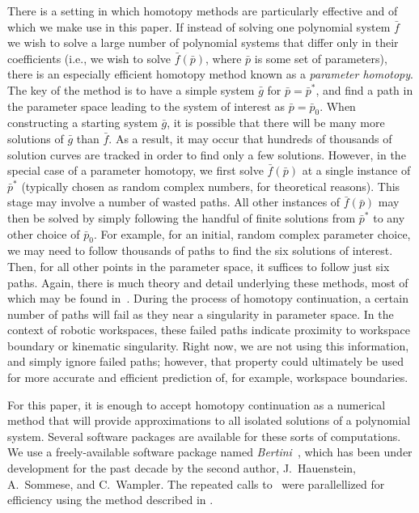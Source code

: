 \documentclass[12pt]{report}
\begin{document}
There is a setting in which homotopy methods are particularly effective and of which we make use in this paper.  If instead of solving one polynomial system $\bar{f}$  we wish to solve a large number of polynomial systems that differ only in their coefficients (i.e., we wish to solve $\bar{f}(\bar{p})$, where $\bar{p}$ is some set of parameters), there is an especially efficient homotopy method known as a {\em parameter homotopy}.  The key of the method is to have a simple system $\bar{g}$ for $\bar{p}=\bar{p}^*$, and find a path in the parameter space leading to the system of interest as $\bar{p}=\bar{p}_0$. When constructing a starting system $\bar{g}$, it is possible that there will be many more solutions of $\bar{g}$ than $\bar{f}$.  As a result, it may occur that hundreds of thousands of  solution curves are tracked in order to find only a few solutions.  However, in the special case of a parameter homotopy, we first solve $\bar{f}(\bar{p})$ at a single instance of  $\bar{p}^*$ (typically chosen as random complex numbers, for theoretical reasons).  This stage may involve a number of wasted paths.  All other instances of $\bar{f}(\bar{p})$ may then be solved by simply following the handful of finite solutions from $\bar{p}^*$ to any other choice of $\bar{p}_0$.  For example, for an initial, random complex parameter choice, we may need to follow thousands of paths to find the six solutions of interest.  Then, for all other points in the parameter space, it suffices to follow just six paths.  Again, there is much theory and detail underlying these methods, most of which may be found in~\cite{SW05}.  During the process of homotopy continuation, a certain number of paths will fail as they near a singularity in parameter space.  In the context of robotic workspaces, these failed paths indicate proximity to workspace boundary or kinematic singularity.  Right now, we are not using this information, and simply ignore failed paths;  however, that property could ultimately be used for more accurate and efficient prediction of, for example, workspace boundaries.


For this paper, it is enough to accept homotopy continuation as a numerical method that will provide approximations to all isolated solutions of a polynomial system.  Several software packages are available for these sorts of computations.  We use a freely-available software package named \emph{Bertini}~\cite{Bertini}, which has been under development for the past decade by the second author, J.~Hauenstein, A.~Sommese, and C.~Wampler.   The repeated calls to \bertini~were parallellized for efficiency using the method described in \cite{BrBaNi11}.
\end{document}
